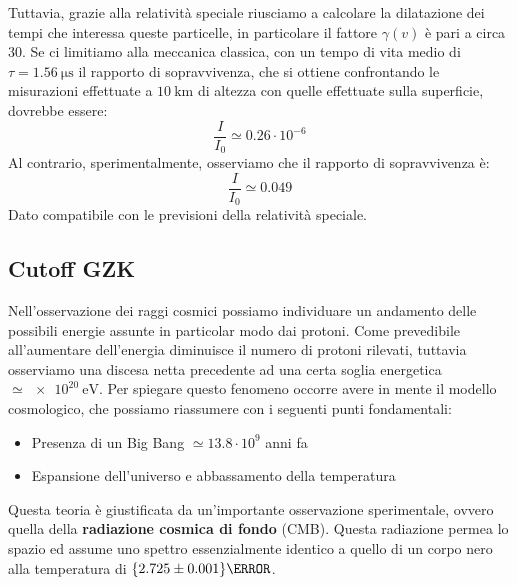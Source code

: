 Tuttavia, grazie alla relatività speciale riusciamo a calcolare la dilatazione dei tempi che interessa queste particelle, in particolare il fattore $\gamma(v)$ è pari a circa 30.
Se ci limitiamo alla meccanica classica, con un tempo di vita medio di $\tau = \qty{1.56}{\micro\second}$ il rapporto di sopravvivenza, che si ottiene confrontando le misurazioni effettuate a $\qty{10}{\kilo\metre}$ di altezza con quelle effettuate sulla superficie, dovrebbe essere:
\begin{equation}
    \dfrac{I}{I_0} \simeq 0.26 \cdot 10^{-6}
\end{equation}
Al contrario, sperimentalmente, osserviamo che il rapporto di sopravvivenza è:
\begin{equation}
    \dfrac{I}{I_0} \simeq 0.049
\end{equation}
Dato compatibile con le previsioni della relatività speciale.

\subsection{Cutoff GZK}


Nell'osservazione dei raggi cosmici possiamo individuare un andamento delle possibili energie assunte in particolar modo dai protoni. Come prevedibile all'aumentare dell'energia diminuisce il numero di protoni rilevati, tuttavia osserviamo una discesa netta precedente ad una certa soglia energetica $\simeq \qty{e20}{\electronvolt}$. Per spiegare questo fenomeno occorre avere in mente il modello cosmologico, che possiamo riassumere con i seguenti punti fondamentali:
\begin{itemize}
  \item Presenza di un Big Bang $\simeq 13.8 \cdot 10^9$ anni fa
  \item Espansione dell'universo e abbassamento della temperatura
\end{itemize}
Questa teoria è giustificata da un'importante osservazione sperimentale, ovvero quella della \textbf{radiazione cosmica di fondo} (CMB). Questa radiazione permea lo spazio ed assume uno spettro essenzialmente identico a quello di un corpo nero alla temperatura di $\qty{2.725 \pm 0.001}{\kelvin}$.


